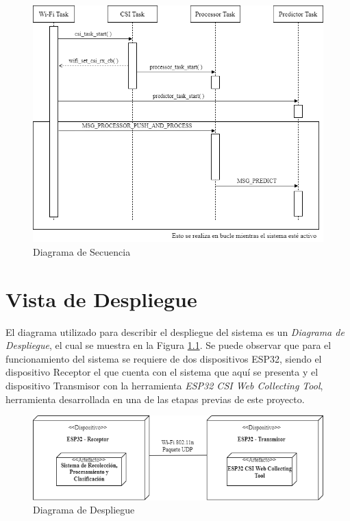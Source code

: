 \documentclass{scrreprt}
\begin{document}
\begin{figure}[h!]
    \centering
    \includegraphics[scale = 0.45]{images/sequence.png}
    \caption{Diagrama de Secuencia}
    \label{fig:secuencia}
\end{figure}

\chapter{Vista de Despliegue}
El diagrama utilizado para describir el despliegue del sistema es un \emph{Diagrama de Despliegue}, el cual se muestra en la Figura \ref{fig:despliegue}. Se puede observar que para el funcionamiento del sistema se requiere de dos dispositivos ESP32, siendo el dispositivo Receptor el que cuenta con el sistema que aquí se presenta y el dispositivo Transmisor con la herramienta \emph{ESP32 CSI Web Collecting Tool}, herramienta desarrollada en una de las etapas previas de este proyecto. 

\begin{figure}[h!]
    \centering
    \includegraphics[scale = 0.60]{images/deployment.png}
    \caption{Diagrama de Despliegue}
    \label{fig:despliegue}
\end{figure}
\end{document}
